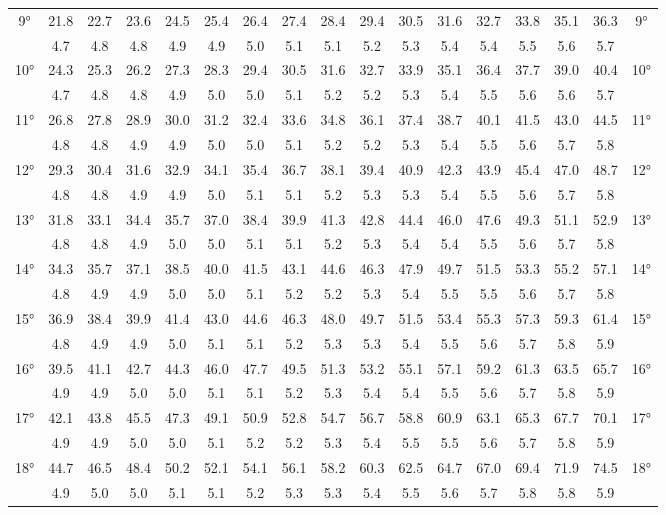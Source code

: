\begin{scriptsize}
\begin{tabular}{c || c | c | c | c | c | c | c | c | c | c | c | c | c | c | c || c}
		\multirow{2}{*}{9°}&21.8&22.7&23.6&24.5&25.4&26.4&27.4&28.4&29.4&30.5&31.6&32.7&33.8&35.1&36.3&\multirow{2}{*}{9°}\\ \space&4.7&4.8&4.8&4.9&4.9&5.0&5.1&5.1&5.2&5.3&5.4&5.4&5.5&5.6&5.7&\space\\\hline
		\multirow{2}{*}{10°}&24.3&25.3&26.2&27.3&28.3&29.4&30.5&31.6&32.7&33.9&35.1&36.4&37.7&39.0&40.4&\multirow{2}{*}{10°}\\ \space&4.7&4.8&4.8&4.9&5.0&5.0&5.1&5.2&5.2&5.3&5.4&5.5&5.6&5.6&5.7&\space\\\hline
		\multirow{2}{*}{11°}&26.8&27.8&28.9&30.0&31.2&32.4&33.6&34.8&36.1&37.4&38.7&40.1&41.5&43.0&44.5&\multirow{2}{*}{11°}\\ \space&4.8&4.8&4.9&4.9&5.0&5.0&5.1&5.2&5.2&5.3&5.4&5.5&5.6&5.7&5.8&\space\\\hline
		\multirow{2}{*}{12°}&29.3&30.4&31.6&32.9&34.1&35.4&36.7&38.1&39.4&40.9&42.3&43.9&45.4&47.0&48.7&\multirow{2}{*}{12°}\\ \space&4.8&4.8&4.9&4.9&5.0&5.1&5.1&5.2&5.3&5.3&5.4&5.5&5.6&5.7&5.8&\space\\\hline
		\multirow{2}{*}{13°}&31.8&33.1&34.4&35.7&37.0&38.4&39.9&41.3&42.8&44.4&46.0&47.6&49.3&51.1&52.9&\multirow{2}{*}{13°}\\ \space&4.8&4.8&4.9&5.0&5.0&5.1&5.1&5.2&5.3&5.4&5.4&5.5&5.6&5.7&5.8&\space\\\hline
		\multirow{2}{*}{14°}&34.3&35.7&37.1&38.5&40.0&41.5&43.1&44.6&46.3&47.9&49.7&51.5&53.3&55.2&57.1&\multirow{2}{*}{14°}\\ \space&4.8&4.9&4.9&5.0&5.0&5.1&5.2&5.2&5.3&5.4&5.5&5.5&5.6&5.7&5.8&\space\\\hline
		\multirow{2}{*}{15°}&36.9&38.4&39.9&41.4&43.0&44.6&46.3&48.0&49.7&51.5&53.4&55.3&57.3&59.3&61.4&\multirow{2}{*}{15°}\\ \space&4.8&4.9&4.9&5.0&5.1&5.1&5.2&5.3&5.3&5.4&5.5&5.6&5.7&5.8&5.9&\space\\\hline
		\multirow{2}{*}{16°}&39.5&41.1&42.7&44.3&46.0&47.7&49.5&51.3&53.2&55.1&57.1&59.2&61.3&63.5&65.7&\multirow{2}{*}{16°}\\ \space&4.9&4.9&5.0&5.0&5.1&5.1&5.2&5.3&5.4&5.4&5.5&5.6&5.7&5.8&5.9&\space\\\hline
		\multirow{2}{*}{17°}&42.1&43.8&45.5&47.3&49.1&50.9&52.8&54.7&56.7&58.8&60.9&63.1&65.3&67.7&70.1&\multirow{2}{*}{17°}\\ \space&4.9&4.9&5.0&5.0&5.1&5.2&5.2&5.3&5.4&5.5&5.5&5.6&5.7&5.8&5.9&\space\\\hline
		\multirow{2}{*}{18°}&44.7&46.5&48.4&50.2&52.1&54.1&56.1&58.2&60.3&62.5&64.7&67.0&69.4&71.9&74.5&\multirow{2}{*}{18°}\\ \space&4.9&5.0&5.0&5.1&5.1&5.2&5.3&5.3&5.4&5.5&5.6&5.7&5.8&5.8&5.9&\space\\\hline

\end{tabular}
\end{scriptsize}
